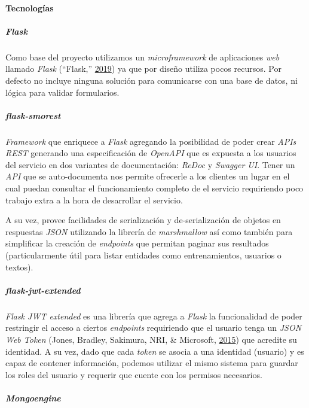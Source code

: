 \documentclass[12pt,a4paper,]{scrartcl}
\let\oldparagraph\paragraph
\renewcommand{\paragraph}[1]{\oldparagraph{#1}\mbox{}}
\let\oldsubparagraph\subparagraph
\renewcommand{\subparagraph}[1]{\oldsubparagraph{#1}\mbox{}}
\begin{document}
\hypertarget{tecnologuxedas-1}{%
\paragraph{Tecnologías}\label{tecnologuxedas-1}}

\hypertarget{flask}{%
\subparagraph{\texorpdfstring{\emph{Flask}}{Flask}}\label{flask}}

Como base del proyecto utilizamos un \emph{microframework} de aplicaciones \emph{web} llamado \emph{Flask} (``Flask,'' \protect\hyperlink{ref-flask}{2019}) ya que por diseño utiliza pocos recursos. Por defecto no incluye ninguna solución para comunicarse con una base de datos, ni lógica para validar formularios.

\hypertarget{flask-smorest}{%
\subparagraph{\texorpdfstring{\emph{flask-smorest}}{flask-smorest}}\label{flask-smorest}}

\emph{Framework} que enriquece a \emph{Flask} agregando la posibilidad de poder crear \emph{APIs REST} generando una especificación de \emph{OpenAPI} que es expuesta a los usuarios del servicio en dos variantes de documentación: \emph{ReDoc} y \emph{Swagger UI}. Tener un \emph{API} que se auto-documenta nos permite ofrecerle a los clientes un lugar en el cual puedan consultar el funcionamiento completo de el servicio requiriendo poco trabajo extra a la hora de desarrollar el servicio.

A su vez, provee facilidades de serialización y de-serialización de objetos en respuestas \emph{JSON} utilizando la librería de \emph{marshmallow} así como también para simplificar la creación de \emph{endpoints} que permitan paginar sus resultados (particularmente útil para listar entidades como entrenamientos, usuarios o textos).

\hypertarget{flask-jwt-extended}{%
\subparagraph{\texorpdfstring{\emph{flask-jwt-extended}}{flask-jwt-extended}}\label{flask-jwt-extended}}

\emph{Flask JWT extended} es una librería que agrega a \emph{Flask} la funcionalidad de poder restringir el acceso a ciertos \emph{endpoints} requiriendo que el usuario tenga un \emph{JSON Web Token} (Jones, Bradley, Sakimura, NRI, \& Microsoft, \protect\hyperlink{ref-JWT}{2015}) que acredite su identidad. A su vez, dado que cada \emph{token} se asocia a una identidad (usuario) y es capaz de contener información, podemos utilizar el mismo sistema para guardar los roles del usuario y requerir que cuente con los permisos necesarios.

\hypertarget{mongoengine}{%
\subparagraph{\texorpdfstring{\emph{Mongoengine}}{Mongoengine}}\label{mongoengine}}
\end{document}
